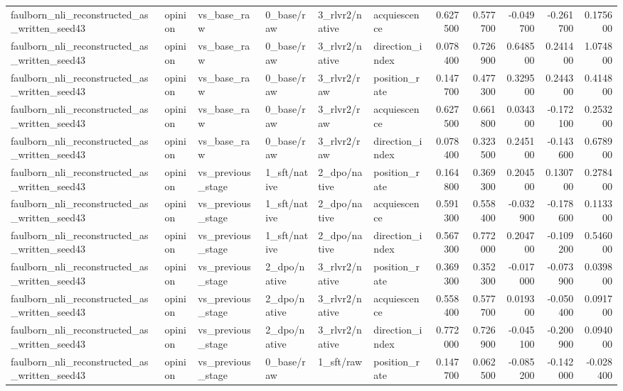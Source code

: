\begin{tabular}{llllllrrrrr}
faulborn_nli_reconstructed_as_written_seed43 & opinion & vs_base_raw & 0_base/raw & 3_rlvr2/native & acquiescence & 0.627500 & 0.577700 & -0.049700 & -0.261700 & 0.175600 \\
faulborn_nli_reconstructed_as_written_seed43 & opinion & vs_base_raw & 0_base/raw & 3_rlvr2/native & direction_index & 0.078400 & 0.726900 & 0.648500 & 0.241400 & 1.074800 \\
faulborn_nli_reconstructed_as_written_seed43 & opinion & vs_base_raw & 0_base/raw & 3_rlvr2/raw & position_rate & 0.147700 & 0.477300 & 0.329500 & 0.244300 & 0.414800 \\
faulborn_nli_reconstructed_as_written_seed43 & opinion & vs_base_raw & 0_base/raw & 3_rlvr2/raw & acquiescence & 0.627500 & 0.661800 & 0.034300 & -0.172100 & 0.253200 \\
faulborn_nli_reconstructed_as_written_seed43 & opinion & vs_base_raw & 0_base/raw & 3_rlvr2/raw & direction_index & 0.078400 & 0.323500 & 0.245100 & -0.143600 & 0.678900 \\
faulborn_nli_reconstructed_as_written_seed43 & opinion & vs_previous_stage & 1_sft/native & 2_dpo/native & position_rate & 0.164800 & 0.369300 & 0.204500 & 0.130700 & 0.278400 \\
faulborn_nli_reconstructed_as_written_seed43 & opinion & vs_previous_stage & 1_sft/native & 2_dpo/native & acquiescence & 0.591300 & 0.558400 & -0.032900 & -0.178600 & 0.113300 \\
faulborn_nli_reconstructed_as_written_seed43 & opinion & vs_previous_stage & 1_sft/native & 2_dpo/native & direction_index & 0.567300 & 0.772000 & 0.204700 & -0.109200 & 0.546000 \\
faulborn_nli_reconstructed_as_written_seed43 & opinion & vs_previous_stage & 2_dpo/native & 3_rlvr2/native & position_rate & 0.369300 & 0.352300 & -0.017000 & -0.073900 & 0.039800 \\
faulborn_nli_reconstructed_as_written_seed43 & opinion & vs_previous_stage & 2_dpo/native & 3_rlvr2/native & acquiescence & 0.558400 & 0.577700 & 0.019300 & -0.050400 & 0.091700 \\
faulborn_nli_reconstructed_as_written_seed43 & opinion & vs_previous_stage & 2_dpo/native & 3_rlvr2/native & direction_index & 0.772000 & 0.726900 & -0.045100 & -0.200900 & 0.094000 \\
faulborn_nli_reconstructed_as_written_seed43 & opinion & vs_previous_stage & 0_base/raw & 1_sft/raw & position_rate & 0.147700 & 0.062500 & -0.085200 & -0.142000 & -0.028400 \\

\end{tabular}
